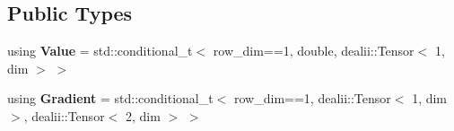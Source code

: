 \subsection*{Public Types}
\begin{DoxyCompactItemize}
\item 
\hypertarget{structSpacy_1_1dealII_1_1Detail_1_1LocalFunGFunctionalDerivativeAssembly_a9869dbf213d562cc5c9a02c80664c83d}{using {\bfseries Value} = std\-::conditional\-\_\-t$<$ row\-\_\-dim==1, double, dealii\-::\-Tensor$<$ 1, dim $>$ $>$}\label{structSpacy_1_1dealII_1_1Detail_1_1LocalFunGFunctionalDerivativeAssembly_a9869dbf213d562cc5c9a02c80664c83d}

\item 
\hypertarget{structSpacy_1_1dealII_1_1Detail_1_1LocalFunGFunctionalDerivativeAssembly_a5903c597a077e4ac462e5adfbd87da9e}{using {\bfseries Gradient} = std\-::conditional\-\_\-t$<$ row\-\_\-dim==1, dealii\-::\-Tensor$<$ 1, dim $>$, dealii\-::\-Tensor$<$ 2, dim $>$ $>$}\label{structSpacy_1_1dealII_1_1Detail_1_1LocalFunGFunctionalDerivativeAssembly_a5903c597a077e4ac462e5adfbd87da9e}

\end{DoxyCompactItemize}

